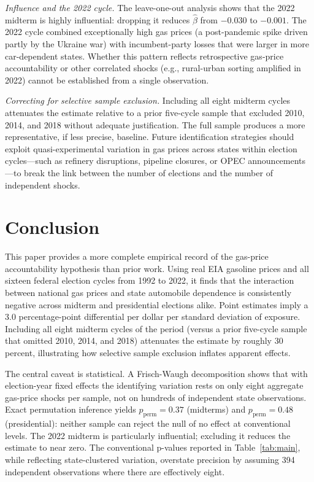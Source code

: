 \documentclass[12pt]{article}
\begin{document}
\textit{Influence and the 2022 cycle.} The leave-one-out analysis shows that the 2022 midterm is highly influential: dropping it reduces $\hat\beta$ from $-0.030$ to $-0.001$. The 2022 cycle combined exceptionally high gas prices (a post-pandemic spike driven partly by the Ukraine war) with incumbent-party losses that were larger in more car-dependent states. Whether this pattern reflects retrospective gas-price accountability or other correlated shocks (e.g., rural-urban sorting amplified in 2022) cannot be established from a single observation.

\textit{Correcting for selective sample exclusion.} Including all eight midterm cycles attenuates the estimate relative to a prior five-cycle sample that excluded 2010, 2014, and 2018 without adequate justification. The full sample produces a more representative, if less precise, baseline. Future identification strategies should exploit quasi-experimental variation in gas prices across states within election cycles---such as refinery disruptions, pipeline closures, or OPEC announcements---to break the link between the number of elections and the number of independent shocks.

\section{Conclusion}
\label{sec:conclusion}

This paper provides a more complete empirical record of the gas-price accountability hypothesis than prior work. Using real EIA gasoline prices and all sixteen federal election cycles from 1992 to 2022, it finds that the interaction between national gas prices and state automobile dependence is consistently negative across midterm and presidential elections alike. Point estimates imply a 3.0 percentage-point differential per dollar per standard deviation of exposure. Including all eight midterm cycles of the period (versus a prior five-cycle sample that omitted 2010, 2014, and 2018) attenuates the estimate by roughly 30 percent, illustrating how selective sample exclusion inflates apparent effects.

The central caveat is statistical. A Frisch-Waugh decomposition shows that with election-year fixed effects the identifying variation rests on only eight aggregate gas-price shocks per sample, not on hundreds of independent state observations. Exact permutation inference yields $p_{\text{perm}}=0.37$ (midterms) and $p_{\text{perm}}=0.48$ (presidential): neither sample can reject the null of no effect at conventional levels. The 2022 midterm is particularly influential; excluding it reduces the estimate to near zero. The conventional p-values reported in Table~\ref{tab:main}, while reflecting state-clustered variation, overstate precision by assuming 394 independent observations where there are effectively eight.
\end{document}

